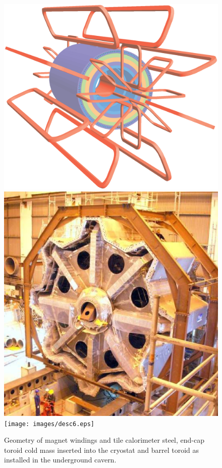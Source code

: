 		
		\begin{figure}[h]
			\begin{center}
				\includegraphics[scale=0.3]{images/ATLcoilGeom.eps}
				\includegraphics[scale=0.3]{images/desc5.eps}\\
				\texttt{[image: images/desc6.eps]}
			\end{center}
			\caption{Geometry of magnet windings and tile calorimeter steel, end-cap toroid cold mass inserted into the cryostat and barrel toroid as installed in the underground cavern.}
			\label{fig:ATLAS_magnet}
		\end{figure}


